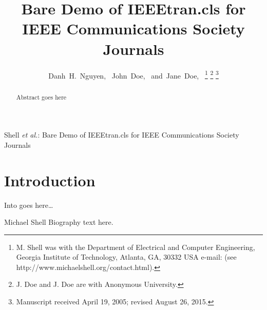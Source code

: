 \documentclass[journal,comsoc]{IEEEtran}
\date{}
\begin{document}


\title{Bare Demo of IEEEtran.cls for\\ IEEE Communications Society Journals}

\author{
    Danh~H.~Nguyen,~
    John~Doe,~
    and~Jane~Doe,~%
\thanks{M. Shell was with the Department
of Electrical and Computer Engineering, Georgia Institute of Technology, Atlanta,
GA, 30332 USA e-mail: (see http://www.michaelshell.org/contact.html).}%
\thanks{J. Doe and J. Doe are with Anonymous University.}%
\thanks{Manuscript received April 19, 2005; revised August 26, 2015.}
}

{Shell \MakeLowercase{\textit{et al.}}: Bare Demo of IEEEtran.cls for IEEE Communications Society Journals}

\maketitle

\begin{abstract}
Abstract goes here
\end{abstract}

\section{Introduction}\label{sec:introduction}

Into goes here\ldots{} \cite{Ujhazi-etal_2010}




% 

\begin{IEEEbiography}{Michael Shell}
Biography text here.
\end{IEEEbiography}
\end{document}
